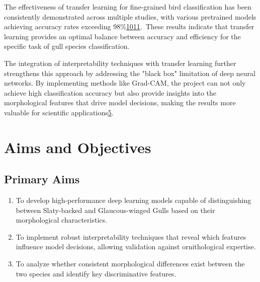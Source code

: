 The effectiveness of transfer learning for fine-grained bird classification has been consistently demonstrated across multiple studies, with various pretrained models achieving accuracy rates exceeding 98\%\href{https://www.semanticscholar.org/paper/41b0718279f408654094557156d4eeeb0067b2c4}{10}\href{https://www.semanticscholar.org/paper/770ee68d1b136cd098a018a399d1f69af29faae0}{11}. These results indicate that transfer learning provides an optimal balance between accuracy and efficiency for the specific task of gull species classification.

The integration of interpretability techniques with transfer learning further strengthens this approach by addressing the "black box" limitation of deep neural networks. By implementing methods like Grad-CAM, the project can not only achieve high classification accuracy but also provide insights into the morphological features that drive model decisions, making the results more valuable for scientific applications\href{https://www.atlantis-press.com/article/125986223.pdf}{5}.

\section*{Aims and Objectives}

\subsection*{Primary Aims}
\begin{enumerate}
    \item To develop high-performance deep learning models capable of distinguishing between Slaty-backed and Glaucous-winged Gulls based on their morphological characteristics.
    \item To implement robust interpretability techniques that reveal which features influence model decisions, allowing validation against ornithological expertise.
    \item To analyze whether consistent morphological differences exist between the two species and identify key discriminative features.
\end{enumerate}

